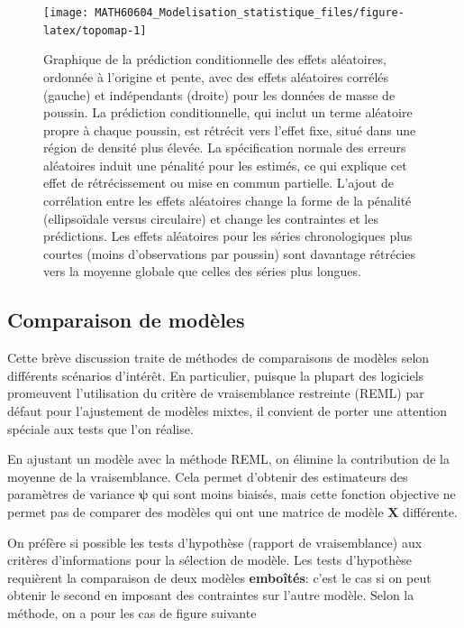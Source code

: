 \documentclass[
  11pt,
  letterpaper,
]{article}
\theoremstyle{definition}
\theoremstyle{definition}
\theoremstyle{definition}
\theoremstyle{definition}
\theoremstyle{remark}
\begin{document}
\begin{figure}

{\centering \texttt{[image: MATH60604\_Modelisation\_statistique\_files/figure-latex/topomap-1]} 

}

\caption{Graphique de la prédiction conditionnelle des effets aléatoires, ordonnée à l'origine et pente, avec des effets aléatoires corrélés (gauche) et indépendants (droite) pour les données de masse de poussin. La prédiction conditionnelle, qui inclut un terme aléatoire propre à chaque poussin, est rétrécit vers l'effet fixe, situé dans une région de densité plus élevée. La spécification normale des erreurs aléatoires induit une pénalité pour les estimés, ce qui explique cet effet de rétrécissement ou mise en commun partielle. L'ajout de corrélation entre les effets aléatoires change la forme de la pénalité (ellipsoïdale versus circulaire) et change les contraintes et les prédictions. Les effets aléatoires pour les séries chronologiques plus courtes (moins d'observations par poussin) sont davantage rétrécies vers la moyenne globale que celles des séries plus longues.}\label{fig:topomap}
\end{figure}

\hypertarget{comparaison-de-moduxe8les}{%
\subsection{Comparaison de modèles}\label{comparaison-de-moduxe8les}}

Cette brève discussion traite de méthodes de comparaisons de modèles selon différents scénarios d'intérêt.
En particulier, puisque la plupart des logiciels promeuvent l'utilisation du critère de vraisemblance restreinte (REML) par défaut pour l'ajustement de modèles mixtes, il convient de porter une attention spéciale aux tests que l'on réalise.

En ajustant un modèle avec la méthode REML, on élimine la contribution de la moyenne de la vraisemblance. Cela permet d'obtenir des estimateurs des paramètres de variance \(\boldsymbol{\psi}\) qui sont moins biaisés, mais cette fonction objective ne permet pas de comparer des modèles qui ont une matrice de modèle \(\mathbf{X}\) différente.

On préfère si possible les tests d'hypothèse (rapport de vraisemblance) aux critères d'informations pour la sélection de modèle. Les tests d'hypothèse requièrent la comparaison de deux modèles \textbf{emboîtés}: c'est le cas si on peut obtenir le second en imposant des contraintes sur l'autre modèle. Selon la méthode, on a pour les cas de figure suivante
\end{document}
